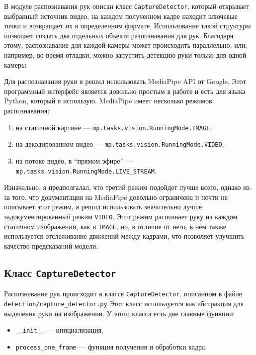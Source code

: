 \documentclass[12pt, a4paper]{article}
\begin{document}
В модуле распознавания рук описан класс \texttt{CaptureDetector}, который
открывает выбранный источник видео, на каждом полученном кадре находит
ключевые точки и возвращает их в определенном формате. Использование такой
структуры позволяет создать два отдельных объекта разпознавания для рук.
Благодаря этому, распознавание для каждой камеры может происходить параллельно,
или, например, во время отладки, можно запустить детекцию руки только для одной
камеры.

Для распознавания руки я решил использовать MediaPipe API от Google. Этот
программный интерфейс является довольно простым в работе и есть для языка
Python, который я использую.
MediaPipe имеет несколько режимов распознавания:
\begin{enumerate}
  \item на статичной картине --- \texttt{mp.tasks.vision.RunningMode.IMAGE},
  \item на декодированном видео --- \texttt{mp.tasks.vision.RunningMode.VIDEO},
  \item на потоке видео, в ``прямом эфире'' --- \texttt{mp.tasks.vision.RunningMode.LIVE\_STREAM}.
\end{enumerate}

Изначально, я предполгалал, что третий режим подойдет лучше всего, однако из-за
того, что документация на MediaPipe довольно ограничена и почти не описывает
этот режим, я решил использовать значительно лучше задокументированный режим
\texttt{VIDEO}. Этот режим распознает руку на каждом статичном изображении, как
и \texttt{IMAGE}, но, в отличие от него, в нем также используется отслеживание
движений между кадрами, что позволяет улучшить качество предсказаний модели.

\subsection{Класс \texttt{CaptureDetector}}
Распознавание рук происходит в классе \texttt{CaptureDetector}, описанном в файле \\ 
\texttt{detection/capture\_detector.py}
Этот класс используется как абстракция для выделения руки на изображении. У
этого класса есть две главные функции:
\begin{itemize}
  \item \texttt{\_\_init\_\_} --- инициализация,
  \item \texttt{process\_one\_frame} --- функция получения и обработки кадра.
\end{itemize}
\end{document}
